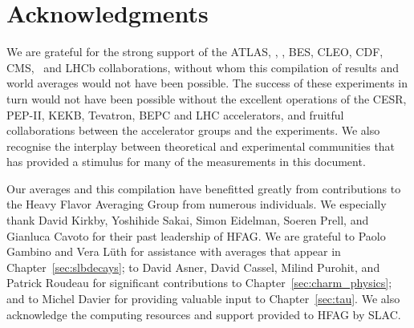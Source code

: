 \section{Acknowledgments}

We are grateful for the strong support of the 
ATLAS, \babar, \belle, BES, CLEO, CDF, CMS, \dzero\ and LHCb collaborations,
without whom this compilation of results and world averages would not have  
been possible. The success of these experiments in turn would 
not have been possible without the excellent operations of the 
CESR, PEP-II, KEKB, Tevatron, BEPC and LHC accelerators, and fruitful 
collaborations between the accelerator groups and the experiments.
We also recognise the interplay between theoretical and experimental
communities that has provided a stimulus for many of the measurements in this
document.

Our averages and this compilation have benefitted greatly from 
contributions to the Heavy Flavor Averaging Group from numerous
individuals. We especially thank David Kirkby, Yoshihide Sakai, 
Simon Eidelman, Soeren Prell, and Gianluca Cavoto for their
past leadership of HFAG. 
We are grateful to Paolo Gambino and Vera L\"{u}th for assistance with
averages that appear in Chapter~\ref{sec:slbdecays};
to David Asner, David Cassel, Milind Purohit, and 
Patrick Roudeau for significant contributions to 
Chapter~\ref{sec:charm_physics};
and to Michel Davier for providing valuable input to Chapter~\ref{sec:tau}.
We also acknowledge the computing resources and support provided to HFAG by
SLAC.
